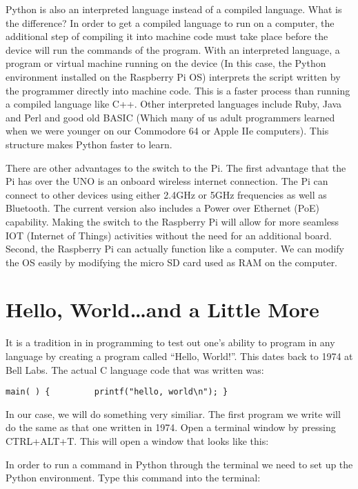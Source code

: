 \documentclass[
]{book}
\begin{document}
Python is also an interpreted language instead of a compiled language. What is the difference? In order to get a compiled language to run on a computer, the additional step of compiling it into machine code must take place before the device will run the commands of the program. With an interpreted language, a program or virtual machine running on the device (In this case, the Python environment installed on the Raspberry Pi OS) interprets the script written by the programmer directly into machine code. This is a faster process than running a compiled language like C++. Other interpreted languages include Ruby, Java and Perl and good old BASIC (Which many of us adult programmers learned when we were younger on our Commodore 64 or Apple IIe computers). This structure makes Python faster to learn.

There are other advantages to the switch to the Pi. The first advantage that the Pi has over the UNO is an onboard wireless internet connection. The Pi can connect to other devices using either 2.4GHz or 5GHz frequencies as well as Bluetooth. The current version also includes a Power over Ethernet (PoE) capability. Making the switch to the Raspberry Pi will allow for more seamless IOT (Internet of Things) activities without the need for an additional board. Second, the Raspberry Pi can actually function like a computer. We can modify the OS easily by modifying the micro SD card used as RAM on the computer.

\hypertarget{hello-worldand-a-little-more}{%
\section{Hello, World\ldots and a Little More}\label{hello-worldand-a-little-more}}

It is a tradition in in programming to test out one's ability to program in any language by creating a program called ``Hello, World!''. This dates back to 1974 at Bell Labs. The actual C language code that was written was:

\texttt{main(\ )\ \{\ \ \ \ \ \ \ \ \ printf("hello,\ world\textbackslash{}n");\ \}}

In our case, we will do something very similiar. The first program we write will do the same as that one written in 1974. Open a terminal window by pressing CTRL+ALT+T. This will open a window that looks like this:

In order to run a command in Python through the terminal we need to set up the Python environment. Type this command into the terminal:
\end{document}
